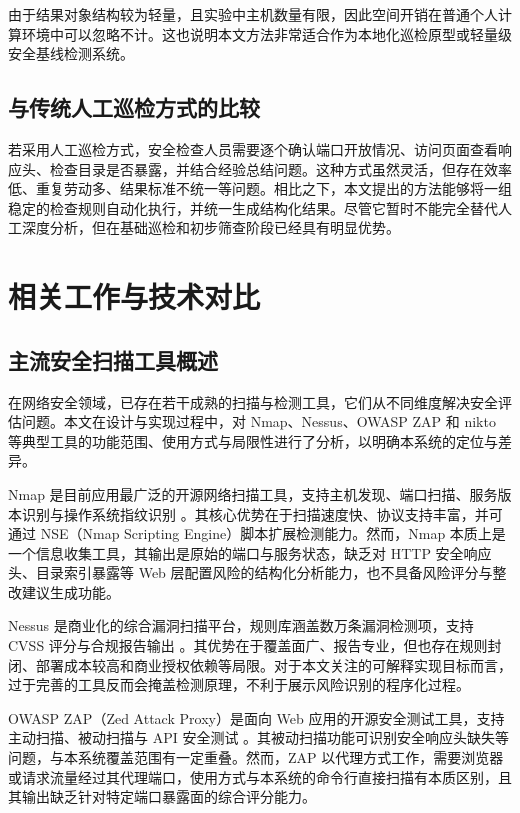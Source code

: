\documentclass[12pt,a4paper,fontset=none]{ctexart}
\begin{document}
由于结果对象结构较为轻量，且实验中主机数量有限，因此空间开销在普通个人计算环境中可以忽略不计。这也说明本文方法非常适合作为本地化巡检原型或轻量级安全基线检测系统。

\subsection{与传统人工巡检方式的比较}

若采用人工巡检方式，安全检查人员需要逐个确认端口开放情况、访问页面查看响应头、检查目录是否暴露，并结合经验总结问题。这种方式虽然灵活，但存在效率低、重复劳动多、结果标准不统一等问题。相比之下，本文提出的方法能够将一组稳定的检查规则自动化执行，并统一生成结构化结果。尽管它暂时不能完全替代人工深度分析，但在基础巡检和初步筛查阶段已经具有明显优势。

\section{相关工作与技术对比}

\subsection{主流安全扫描工具概述}

在网络安全领域，已存在若干成熟的扫描与检测工具，它们从不同维度解决安全评估问题。本文在设计与实现过程中，对 Nmap、Nessus、OWASP ZAP 和 nikto 等典型工具的功能范围、使用方式与局限性进行了分析，以明确本系统的定位与差异。

Nmap 是目前应用最广泛的开源网络扫描工具，支持主机发现、端口扫描、服务版本识别与操作系统指纹识别 \cite{nmap-book}。其核心优势在于扫描速度快、协议支持丰富，并可通过 NSE（Nmap Scripting Engine）脚本扩展检测能力。然而，Nmap 本质上是一个信息收集工具，其输出是原始的端口与服务状态，缺乏对 HTTP 安全响应头、目录索引暴露等 Web 层配置风险的结构化分析能力，也不具备风险评分与整改建议生成功能。

Nessus 是商业化的综合漏洞扫描平台，规则库涵盖数万条漏洞检测项，支持 CVSS 评分与合规报告输出 \cite{nessus-guide}。其优势在于覆盖面广、报告专业，但也存在规则封闭、部署成本较高和商业授权依赖等局限。对于本文关注的可解释实现目标而言，过于完善的工具反而会掩盖检测原理，不利于展示风险识别的程序化过程。

OWASP ZAP（Zed Attack Proxy）是面向 Web 应用的开源安全测试工具，支持主动扫描、被动扫描与 API 安全测试 \cite{owasp-asvs}。其被动扫描功能可识别安全响应头缺失等问题，与本系统覆盖范围有一定重叠。然而，ZAP 以代理方式工作，需要浏览器或请求流量经过其代理端口，使用方式与本系统的命令行直接扫描有本质区别，且其输出缺乏针对特定端口暴露面的综合评分能力。
\end{document}
